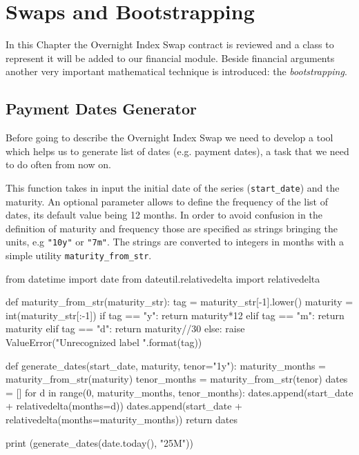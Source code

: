 \chapter{Swaps and Bootstrapping}\label{sec:swaps-and-bootstrapping}

In this Chapter the Overnight Index Swap contract is reviewed and a class to represent it will be added to our financial module. Beside financial arguments another very important mathematical technique is introduced: the \emph{bootstrapping}.

\section{Payment Dates Generator}
Before going to describe the Overnight Index Swap we need to develop a tool which helps us to generate list of dates (e.g. payment dates), a task that we need to do often from now on. 

\begin{finmarkets}
This function takes in input the initial date of the series (\texttt{start\_date}) and the maturity. An optional parameter allows to define the frequency of the list of dates, its default value being 12 months.
In order to avoid confusion in the definition of maturity and frequency those are specified as strings bringing the units, e.g \texttt{"10y"} or \texttt{"7m"}.
The strings are converted to integers in months with a simple utility \texttt{maturity\_from\_str}.
\end{finmarkets}

\begin{ipython}
from datetime import date
from dateutil.relativedelta import relativedelta

def maturity_from_str(maturity_str):
    tag = maturity_str[-1].lower()
    maturity = int(maturity_str[:-1])
    if tag == "y":
        return maturity*12
    elif tag == "m":
        return maturity
    elif tag == "d":
        return maturity//30
    else:
        raise ValueError("Unrecognized label {}".format(tag))

def generate_dates(start_date, maturity, tenor="1y"):
    maturity_months = maturity_from_str(maturity)
    tenor_months = maturity_from_str(tenor)
    dates = []
    for d in range(0, maturity_months, tenor_months):
        dates.append(start_date + relativedelta(months=d))
    dates.append(start_date + relativedelta(months=maturity_months))
    return dates

print (generate_dates(date.today(), "25M"))
\end{ipython}
\begin{ioutput}
\end{ioutput}

